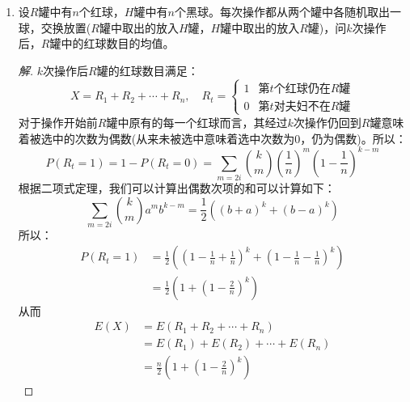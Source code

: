 \documentclass[12pt]{article}
\newcommand{\hei}{\CJKfamily{hei}}                          %
\begin{document}
\begin{enumerate}
\item {\hei 设$R$罐中有$n$个红球，$H$罐中有$n$个黑球。每次操作都从两个罐中各随机取出一球，交换放置($R$罐中取出的放入$H$罐，$H$罐中取出的放入$R$罐)，问$k$次操作后，$R$罐中的红球数目的均值。}

\begin{proof}[解]
	$k$次操作后$R$罐的红球数目满足：
	\begin{equation}
	X=R_1+R_2+\cdots+R_n,\quad R_t=\left\{
	\begin{array}{cc}
	1 & \mbox{第$t$个红球仍在$R$罐}\\
	0 & \mbox{第$t$对夫妇不在$R$罐}
	\end{array}
	\right.
	\end{equation}
	对于操作开始前$R$罐中原有的每一个红球而言，其经过$k$次操作仍回到$R$罐意味着被选中的次数为偶数(从来未被选中意味着选中次数为0，仍为偶数)。所以：
	\begin{equation}
	P(R_t=1)=1-P(R_t=0)=\sum_{m=2i}\binom{k}{m}\left(\frac{1}{n}\right)^m\left(1-\frac{1}{n}\right)^{k-m}
	\end{equation}
	根据二项式定理，我们可以计算出偶数次项的和可以计算如下：
	\begin{equation}
	\sum_{m=2i}\binom{k}{m}a^mb^{k-m}=\frac{1}{2}\left(\left(b+a\right)^k+\left(b-a\right)^k\right)
	\end{equation}
	所以：
	\begin{equation}\begin{aligned}
	P(R_t=1)&=\frac{1}{2}\left(\left(1-\frac{1}{n}+\frac{1}{n}\right)^k+\left(1-\frac{1}{n}-\frac{1}{n}\right)^k\right) \\
	&=\frac{1}{2}\left(1+\left(1-\frac{2}{n}\right)^k\right) 
	\end{aligned}
	\end{equation}
	从而
	\begin{equation}
	\begin{aligned}
	E(X)&=E(R_1+R_2+\cdots+R_n) \\
	&=E(R_1)+E(R_2)+\cdots+E(R_n) \\
	&=\frac{n}{2}\left(1+\left(1-\frac{2}{n}\right)^k\right)
	\end{aligned}
	\end{equation}
\end{proof}


\end{enumerate}
\end{document}
